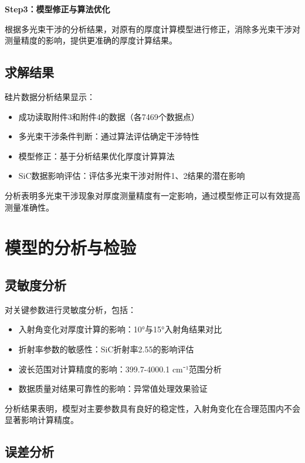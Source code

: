 \documentclass[withoutpreface,bwprint]{cumcmthesis}
\begin{document}
\textbf{Step3：模型修正与算法优化} 

根据多光束干涉的分析结果，对原有的厚度计算模型进行修正，消除多光束干涉对测量精度的影响，提供更准确的厚度计算结果。

\subsection{求解结果}

硅片数据分析结果显示：
\begin{itemize}[itemindent=2em]
\item 成功读取附件3和附件4的数据（各7469个数据点）
\item 多光束干涉条件判断：通过算法评估确定干涉特性
\item 模型修正：基于分析结果优化厚度计算算法
\item SiC数据影响评估：评估多光束干涉对附件1、2结果的潜在影响
\end{itemize}

分析表明多光束干涉现象对厚度测量精度有一定影响，通过模型修正可以有效提高测量准确性。


\section{模型的分析与检验}

\subsection{灵敏度分析}

对关键参数进行灵敏度分析，包括：
\begin{itemize}[itemindent=2em]
\item 入射角变化对厚度计算的影响：10°与15°入射角结果对比
\item 折射率参数的敏感性：SiC折射率2.55的影响评估
\item 波长范围对计算精度的影响：399.7-4000.1 cm⁻¹范围分析
\item 数据质量对结果可靠性的影响：异常值处理效果验证
\end{itemize}

分析结果表明，模型对主要参数具有良好的稳定性，入射角变化在合理范围内不会显著影响计算精度。

\subsection{误差分析}
\end{document}
